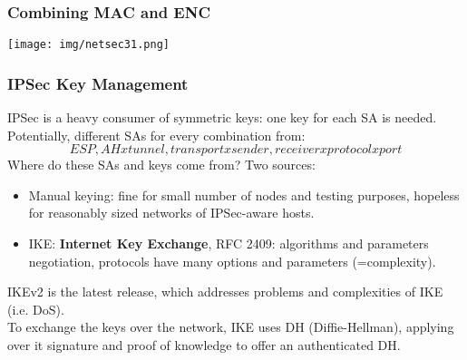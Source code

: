\documentclass[a4paper, 10pt, titlepage]{article}
\begin{document}
\subsubsection*{Combining MAC and ENC}
\begin{center}
	\texttt{[image: img/netsec31.png]}
\end{center}

\subsubsection*{IPSec Key Management}
IPSec is a heavy consumer of symmetric keys: one key for each SA is needed. Potentially, different SAs for every combination from:
$${ESP,AH} x {tunnel,transport} x {sender, receiver} x {protocol} x {port}$$
Where do these SAs and keys come from? Two sources:
\begin{itemize}
	\item Manual keying: fine for small number of nodes and testing purposes, hopeless for reasonably sized networks of IPSec-aware hosts.
	\item IKE: \textbf{Internet Key Exchange}, RFC 2409: algorithms and parameters negotiation, protocols have many options and parameters (=complexity).
\end{itemize}
IKEv2 is the latest release, which addresses problems and complexities of IKE (i.e. DoS). \\
To exchange the keys over the network, IKE uses DH (Diffie-Hellman), applying over it signature and proof of knowledge to offer an authenticated DH.
\end{document}
